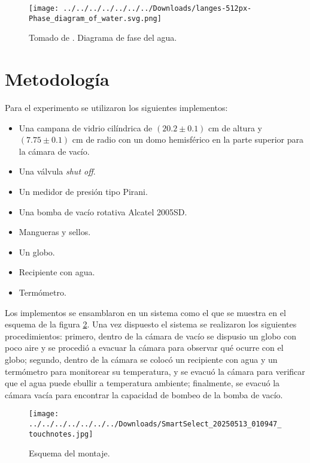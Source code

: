 \documentclass[final,5p,times,twocolumn, nopreprintline]{elsarticle}
\numberwithin{equation}{section}
\begin{document}
\begin{figure}[h!]
\begin{center}
\texttt{[image: ../../../../../../../Downloads/langes-512px-Phase\_diagram\_of\_water.svg.png]} 
\caption{Tomado de \cite{diagram}. Diagrama de fase del agua.} \label{fig3}
\end{center}
\end{figure}

\section{Metodología}

Para el experimento se utilizaron los siguientes implementos:

\begin{itemize}
\item Una campana de vidrio cilíndrica de $(20.2\pm0.1)$ cm de altura y $(7.75\pm0.1)$ cm de radio con un domo hemisférico en la parte superior para la cámara de vacío.
\item Una válvula \emph{shut off}.
\item Un medidor de presión tipo Pirani.
\item Una bomba de vacío rotativa Alcatel 2005SD.
\item Mangueras y sellos.
\item Un globo.
\item Recipiente con agua.
\item Termómetro.
\end{itemize}

Los implementos se ensamblaron en un sistema como el que se muestra en el esquema de la figura \ref{fig4}. Una vez dispuesto el sistema se realizaron los siguientes procedimientos: primero, dentro de la cámara de vacío se dispusio un globo con poco aire y se procedió a evacuar la cámara para observar qué ocurre con el globo; segundo, dentro de la cámara se colocó un recipiente con agua y un termómetro para monitorear su temperatura, y se evacuó la cámara para verificar que el agua puede ebullir a temperatura ambiente; finalmente, se evacuó la cámara vacía para encontrar la capacidad de bombeo de la bomba de vacío.

\begin{figure}[h!]
\begin{center}
\texttt{[image: ../../../../../../../Downloads/SmartSelect\_20250513\_010947\_touchnotes.jpg]} 
\caption{Esquema del montaje.} \label{fig4}
\end{center}
\end{figure}
\end{document}
